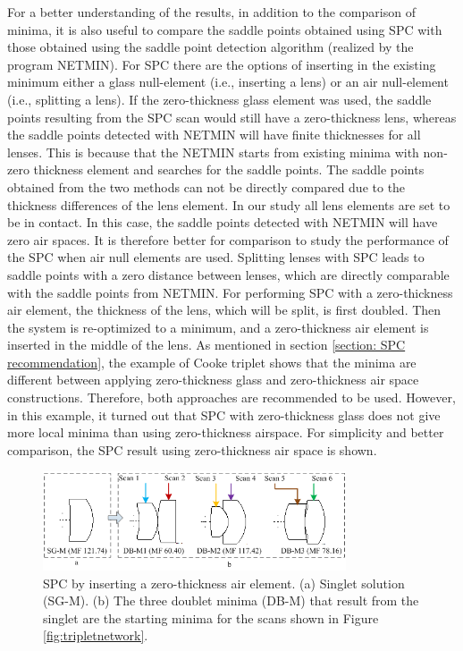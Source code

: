 For a better understanding of the results, in addition to the comparison of minima, it is also useful to compare the saddle points obtained using SPC with those obtained using the saddle point detection algorithm (realized by the program NETMIN). For SPC there are the options of inserting in the existing minimum either a glass null-element (i.e., inserting a lens) or an air null-element (i.e., splitting a lens). If the zero-thickness glass element was used, the saddle points resulting from the SPC scan would still have a zero-thickness lens, whereas the saddle points detected with NETMIN will have finite thicknesses for all lenses. This is because that the NETMIN starts from existing minima with non-zero thickness element and searches for the saddle points. The saddle points obtained from the two methods can not be directly compared due to the thickness differences of the lens element. In our study all lens elements are set to be in contact. In this case, the saddle points detected with NETMIN will have zero air spaces. It is therefore better for comparison to study the performance of the SPC when air null elements are used. Splitting lenses with SPC leads to saddle points with a zero distance between lenses, which are directly comparable with the saddle points from NETMIN. For performing SPC with a zero-thickness air element, the thickness of the lens, which will be split, is first doubled. Then the system is re-optimized to a minimum, and a zero-thickness air element is inserted in the middle of the lens. As mentioned in section \ref{section: SPC recommendation}, the example of Cooke triplet shows that the minima are different between applying zero-thickness glass and zero-thickness air space constructions. Therefore, both approaches are recommended to be used. However, in this example, it turned out that SPC with zero-thickness glass does not give more local minima than using zero-thickness airspace. For simplicity and better comparison, the SPC result using zero-thickness air space is shown. 
\begin{figure}[h!]
    \centering
    \includegraphics[width=0.8\textwidth]{chapter-3/figures/Single2Double.png}
    \caption{SPC by inserting a zero-thickness air element. (a) Singlet solution (SG-M). (b) The three doublet minima (DB-M) that result from the singlet are the starting minima for the scans shown in Figure \ref{fig:tripletnetwork}.}
    \label{fig:single2double}
\end{figure}

